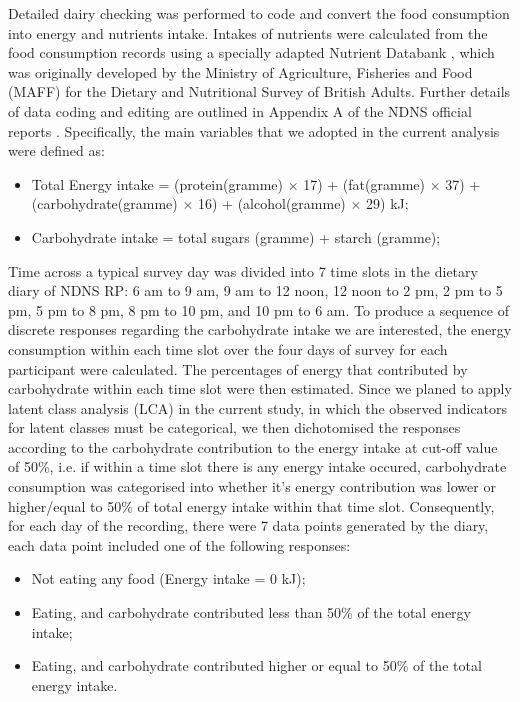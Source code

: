 Detailed dairy checking was performed to code and convert the food consumption into energy and nutrients intake. Intakes of nutrients were calculated from the food consumption records using a specially adapted Nutrient Databank \parencite{smithers1993maff}, which was originally developed by the Ministry of Agriculture, Fisheries and Food (MAFF) for the Dietary and Nutritional Survey of British Adults. Further details of data
coding and editing are outlined in Appendix A of the NDNS official reports \parencite{NDNSofficial}. Specifically, the main variables that we adopted in the current analysis were defined as: 

\begin{itemize}
	\item Total Energy intake = (protein(gramme) $\times$ 17) + (fat(gramme) $\times$ 37) + (carbohydrate(gramme) $\times$ 16) + (alcohol(gramme) $\times$ 29)  kJ;
	\item Carbohydrate intake = total sugars (gramme) + starch (gramme); 
\end{itemize}

Time across a typical survey day was divided into 7 time slots in the dietary diary of NDNS RP: 6 am to 9 am, 9 am to 12 noon, 12 noon to 2 pm, 2 pm to 5 pm, 5 pm to 8 pm, 8 pm to 10 pm, and 10 pm to 6 am. To produce a sequence of discrete responses regarding the carbohydrate intake we are interested, the energy consumption within each time slot over the four days of survey for each participant were calculated. The percentages of energy that contributed by carbohydrate within each time slot were then estimated. Since we planed to apply latent class analysis (LCA) in the current study, in which the observed indicators for latent classes must be categorical, we then dichotomised the responses according to the carbohydrate contribution to the energy intake at cut-off value of 50\%, i.e. if within a time slot there is any energy intake occured, carbohydrate consumption was categorised into whether it's energy contribution was lower or higher/equal to 50\% of total energy intake within that time slot. Consequently, for each day of the recording, there were 7 data points generated by the diary, each data point included one of the following responses:

\begin{itemize}
	\item Not eating any food (Energy intake = 0 kJ); 
	\item Eating, and carbohydrate contributed less than 50\% of the total energy intake;
	\item Eating, and carbohydrate contributed higher or equal to 50\% of the total energy intake.
\end{itemize}
\vspace{-0.5cm}


